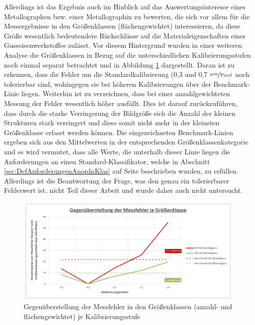\documentclass[
fontsize=10pt, 
listof = totoc,
parskip = half	
]{report}
\begin{document}
Allerdings ist das Ergebnis auch im Hinblick auf das Auswertungsinteresse eines Metallographen bzw. einer Metallographin zu bewerten, die sich vor allem für die Messergebnisse in den Größenklassen (flächengewichtet) interessieren, da diese Größe wesentlich bedeutendere Rückschlüsse auf die Materialeigenschaften eines Gusseisenwerkstoffes zulässt. Vor diesem Hintergrund wurden in einer weiteren Analyse die Größenklassen in Bezug auf die unterschiedlichen Kalibrierungsstufen noch einmal separat betrachtet und in Abbildung \ref{fig:DAGesamtKalibBenchmark} dargestellt. Daran ist zu erkennen, dass die Fehler um die Standardkalibrierung (0,3 und 0,7 $\nicefrac{\mu m}{\text{Pixel}}$ noch tolerierbar sind, wohingegen sie bei höheren Kalibrierungen über der Benchmark-Linie liegen. Weiterhin ist zu verzeichnen, dass bei einer anzahlgewichteten Messung der Fehler wesentlich höher ausfällt. Dies ist darauf zurückzuführen, dass durch die starke Verringerung der Bildgröße sich die Anzahl der kleinen Strukturen stark verringert und diese somit nicht mehr in der kleinsten Größenklasse erfasst werden können. Die eingezeichneten Benchmark-Linien ergeben sich aus den Mittelwerten in der entsprechenden Größenklassenkategorie und es wird vermutet, dass alle Werte, die unterhalb dieser Linie liegen die Anforderungen an einen Standard-Klassifikator, welche in Abschnitt \ref{sec:DefAnforderungenAnordnKlas} auf Seite \pageref{sec:DefAnforderungenAnordnKlas} beschrieben wurden, zu erfüllen. Allerdings ist die Beantwortung der Frage, was den genau ein tolerierbarer Fehlerwert ist, nicht Teil dieser Arbeit und wurde daher auch nicht untersucht.

\begin{figure}[H]
	\centering
	\includegraphics[width=\textwidth, height=\textheight, keepaspectratio]{pics/DA_Gesamt_GK_Kalib_Benchmark}
	\caption{Gegenüberstellung der Messfehler in den Größenklassen (anzahl- und flächengewichtet) je Kalibrierungsstufe}
	\label{fig:DAGesamtKalibBenchmark}
\end{figure}
\end{document}
